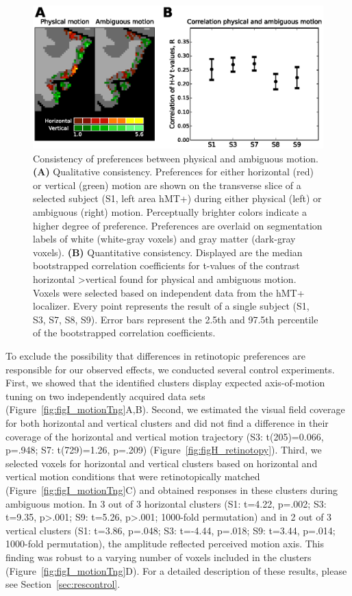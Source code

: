 \begin{figure}[htb!]
\centering
\includegraphics[width=\textwidth]{figures/chapter_03/fig3.eps}
\caption{Consistency of preferences between physical and ambiguous motion. \textbf{(A)} Qualitative consistency. Preferences for either horizontal (red) or vertical (green) motion are shown on the transverse slice of a selected subject (S1, left area hMT+) during either physical (left) or ambiguous (right) motion. Perceptually brighter colors indicate a higher degree of preference. Preferences are overlaid on segmentation labels of white (white-gray voxels) and gray matter (dark-gray voxels). \textbf{(B)} Quantitative consistency. Displayed are the median bootstrapped correlation coefficients for t-values of the contrast horizontal \textgreater vertical found for physical and ambiguous motion. Voxels were selected based on independent data from the hMT+ localizer. Every point represents the result of a single subject (S1, S3, S7, S8, S9). Error bars represent the 2.5th and 97.5th percentile of the bootstrapped correlation coefficients.}
\label{fig:consistency}
\end{figure}

To exclude the possibility that differences in retinotopic preferences are responsible for our observed effects, we conducted several control experiments. First, we showed that the identified clusters display expected axis-of-motion tuning on two independently acquired data sets (Figure~\ref{fig:figI_motionTng}A,B). Second, we estimated the visual field coverage for both horizontal and vertical clusters and did not find a difference in their coverage of the horizontal and vertical motion trajectory (S3: t(205)=0.066, p=.948; S7: t(729)=1.26, p=.209) (Figure~\ref{fig:figH_retinotopy}). Third, we selected voxels for horizontal and vertical clusters based on horizontal and vertical motion conditions that were retinotopically matched (Figure~\ref{fig:figI_motionTng}C) and obtained responses in these clusters during ambiguous motion. In 3 out of 3 horizontal clusters (S1: t=4.22, p=.002; S3: t=9.35, p\textgreater.001; S9: t=5.26, p\textgreater.001; 1000-fold permutation) and in 2 out of 3 vertical clusters (S1: t=3.86, p=.048; S3: t=-4.44, p=.018; S9: t=3.44, p=.014; 1000-fold permutation), the amplitude reflected perceived motion axis. This finding was robust to a varying number of voxels included in the clusters (Figure~\ref{fig:figI_motionTng}D). For a detailed description of these results, please see Section~\ref{sec:rescontrol}.

